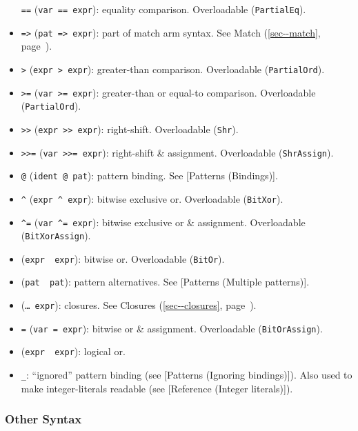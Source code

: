 \documentclass[a4paper,]{book}
\renewcommand*{\hyperlink}[2]{%
 #2 (\autoref{#1}, page~\pageref{#1})}
\begin{document}
\begin{itemize}
  \texttt{==} (\texttt{var\ ==\ expr}): equality comparison.
  Overloadable (\texttt{PartialEq}).
\item
  \texttt{=\textgreater{}} (\texttt{pat\ =\textgreater{}\ expr}): part
  of match arm syntax. See \protect\hyperlink{sec--match}{Match}.
\item
  \texttt{\textgreater{}} (\texttt{expr\ \textgreater{}\ expr}):
  greater-than comparison. Overloadable (\texttt{PartialOrd}).
\item
  \texttt{\textgreater{}=} (\texttt{var\ \textgreater{}=\ expr}):
  greater-than or equal-to comparison. Overloadable
  (\texttt{PartialOrd}).
\item
  \texttt{\textgreater{}\textgreater{}}
  (\texttt{expr\ \textgreater{}\textgreater{}\ expr}): right-shift.
  Overloadable (\texttt{Shr}).
\item
  \texttt{\textgreater{}\textgreater{}=}
  (\texttt{var\ \textgreater{}\textgreater{}=\ expr}): right-shift \&
  assignment. Overloadable (\texttt{ShrAssign}).
\item
  \texttt{@} (\texttt{ident\ @\ pat}): pattern binding. See {[}Patterns
  (Bindings){]}.
\item
  \texttt{\^{}} (\texttt{expr\ \^{}\ expr}): bitwise exclusive or.
  Overloadable (\texttt{BitXor}).
\item
  \texttt{\^{}=} (\texttt{var\ \^{}=\ expr}): bitwise exclusive or \&
  assignment. Overloadable (\texttt{BitXorAssign}).
\item
  \texttt{\textbar{}} (\texttt{expr\ \textbar{}\ expr}): bitwise or.
  Overloadable (\texttt{BitOr}).
\item
  \texttt{\textbar{}} (\texttt{pat\ \textbar{}\ pat}): pattern
  alternatives. See {[}Patterns (Multiple patterns){]}.
\item
  \texttt{\textbar{}} (\texttt{\textbar{}\ldots{}\textbar{}\ expr}):
  closures. See \protect\hyperlink{sec--closures}{Closures}.
\item
  \texttt{\textbar{}=} (\texttt{var\ \textbar{}=\ expr}): bitwise or \&
  assignment. Overloadable (\texttt{BitOrAssign}).
\item
  \texttt{\textbar{}\textbar{}}
  (\texttt{expr\ \textbar{}\textbar{}\ expr}): logical or.
\item
  \texttt{\_}: ``ignored'' pattern binding (see {[}Patterns (Ignoring
  bindings){]}). Also used to make integer-literals readable (see
  {[}Reference (Integer literals){]}).
\end{itemize}

\subsubsection{Other Syntax}\label{other-syntax}
\end{document}
